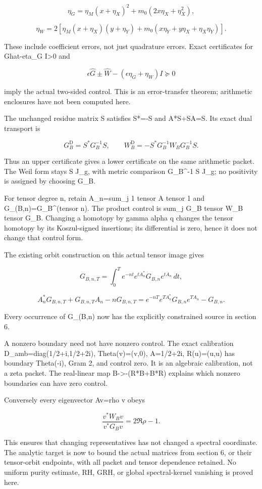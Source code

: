 \[\eta_G=\eta_M(x+\eta_X)^2+m_0(2x\eta_X+\eta_X^2),\]

\[\eta_W=2[\eta_M(x+\eta_X)(y+\eta_Y)+m_0(x\eta_Y+y\eta_X+\eta_X\eta_Y)].\]

These include coefficient errors, not just quadrature errors. Exact certificates for Ghat-eta\_G
I\textgreater0 and

\[\epsilon\widehat G\pm\widehat W-(\epsilon\eta_G+\eta_W)I\succeq0\]

imply the actual two-sided control. This is an error-transfer theorem; arithmetic enclosures have
not been computed here.

The unchanged residue matrix S satisfies S*=-S and A*S+SA=S. Its exact dual transport is

\[G_B^{\mathrm D}=S^*G_B^{-1}S,\qquad W_B^{\mathrm D}=-S^*G_B^{-1}W_BG_B^{-1}S.\]

Thus an upper certificate gives a lower certificate on the same arithmetic packet. The Weil form
stays S J\_g, with metric comparison G\_B\^{}-1 S J\_g; no positivity is assigned by choosing G\_B.

For tensor degree n, retain A\_n=sum\_j 1 tensor A tensor 1 and G\_(B,n)=G\_B\^{}(tensor n). The
product control is sum\_j G\_B tensor W\_B tensor G\_B. Changing a homotopy by gamma alpha q changes
the tensor homotopy by its Koszul-signed insertions; its differential is zero, hence it does not
change that control form.

The existing orbit construction on this actual tensor image gives

\[G_{B,n,T}=\int_0^T e^{-nt}e^{tA_n^*}G_{B,n}e^{tA_n}\,dt,\]

\[A_n^*G_{B,n,T}+G_{B,n,T}A_n-nG_{B,n,T}=e^{-nT}e^{TA_n^*}G_{B,n}e^{TA_n}-G_{B,n}.\]

Every occurrence of G\_(B,n) now has the explicitly constrained source in section 6.

A nonzero boundary need not have nonzero control. The exact calibration D\_amb=diag(1/2+i,1/2+2i),
Theta(v)=(v,0), A=1/2+2i, R(u)=(u,u) has boundary Theta(-i), Gram 2, and control zero. It is an
algebraic calibration, not a zeta packet. The real-linear map B-\textgreater-(R*B+B*R) explains
which nonzero boundaries can have zero control.

Conversely every eigenvector Av=rho v obeys

\[\frac{v^*W_Bv}{v^*G_Bv}=2\Re\rho-1.\]

This ensures that changing representatives has not changed a spectral coordinate. The analytic
target is now to bound the actual matrices from section 6, or their tensor-orbit endpoints, with all
packet and tensor dependence retained. No uniform purity estimate, RH, GRH, or global
spectral-kernel vanishing is proved here.

